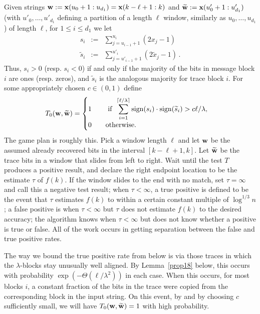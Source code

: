 \documentclass[final,12pt]{colt2018} %
\newcommand{\1}{\mathbf{1}}
\newcommand{\eqbn}{\begin{equation*}}
\newcommand{\eqen}{\end{equation*}}
\newcommand{\op}{\operatorname}
\newcommand{\wt}{\widetilde}
\def\wtt{{\wt {\bf w}}}
\def\x{{\bf x}}
\def\w{{\bf w}}
\begin{document}
Given strings $\w:=\x( u_0+1:u_{d_1} )=\x( k-\ell+1:k )$ and $\wtt:=\x( u'_0+1:u'_{d_1} )$ (with $u'_0,\dots,u'_{d_1}$ defining a partition of a length $\ell$ window, similarly as $u_0,\dots,u_{d_1}$) of length $\ell$, for $1 \leq i \leq d_1$
we let
\begin{eqnarray}
s_i & := & \sum_{j = u_{i-1}+1}^{u_i} (2x_j - 1) \nonumber \\
\wt s_i & := & \sum_{j = u'_{i-1}+1}^{u'_i} (2 \wt x_j - 1)  \, .
\label{eq37}
\end{eqnarray}
Thus, $s_i > 0$ (resp. $s_i< 0$) if and only if the majority of the
bits in message block $i$ are ones (resp. zeros), and $\wt s_i$ is the
analogous majority for trace block $i$.  For some appropriately
chosen $c \in (0,1)$ define
\eqbn
T_0 (\w , \wt\w) =
\begin{cases}
	1 \qquad \displaystyle \text{\,\,if\,\,\,}
	\sum_{i=1}^{\lceil\ell/\lambda\rceil}
	\op{sign} (s_i) \cdot \op{sign}(\wt s_i) >  c \ell/\lambda,\\
	0 \qquad \text{otherwise}.
\end{cases}
\eqen
%
The game plan is roughly this.  Pick a window length $\ell$ and
let $\w$ be the assumed already recovered bits in the interval
$[k - \ell +1, k]$.  Let $\wtt$ be the trace bits in a window
that slides from left to right.  Wait until the test $T$ produces
a positive result, and declare the right endpoint location to be
the estimate $\tau$ of $f(k)$.  If the window slides to the
end with no match, set $\tau = \infty$ and call this a negative
test result; when $\tau < \infty$, a true positive is defined to
be the event that $\tau$ estimates $f(k)$ to within a certain constant
multiple of $\log^{1/3} n$; a false positive is when $\tau < \infty$
but $\tau$ does not estimate $f(k)$ to the desired accuracy; the
algorithm knows when $\tau < \infty$ but does not know whether
a positive is true or false.  All of the work occurs in getting
separation between the false and true positive rates.

The way we bound the true positive rate from below is via
those traces in which the $\lambda$-blocks stay unusually
well aligned.  By Lemma~\ref{prop18} below, this occurs with
probability $\exp (-\Theta (\ell / \lambda^2))$ in each case.
When this occurs,
for most blocks $i$, a constant fraction of the bits in the
trace were copied from the corresponding block in the input string.
On this event, by
and by choosing $c$ sufficiently small, we will have $T_0 (\w,\wt\w) = 1$ with high probability.
\end{document}
